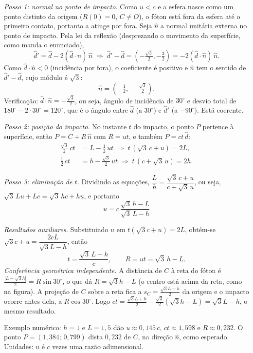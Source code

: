 \documentclass{article}%
\begin{document}
\emph{Passo 1: normal no ponto de impacto.} Como $u<c$ e a esfera nasce como um ponto distinto da origem ($R(0)=0$, $C\neq O$), o fóton está fora da esfera até o primeiro contato, portanto a atinge por fora. Seja $\hat n$ a normal unitária externa no ponto de impacto. Pela lei da reflexão (desprezando o movimento da superfície, como manda o enunciado),
\[
\hat d'=\hat d-2(\hat d\cdot\hat n)\,\hat n
\;\Rightarrow\;
\hat d'-\hat d=\left(-\tfrac{\sqrt3}{2},-\tfrac32\right)=-2(\hat d\cdot \hat n)\,\hat n .
\]
Como $\hat d\cdot\hat n<0$ (incidência por fora), o coeficiente é positivo e $\hat n$ tem o sentido de $\hat d'-\hat d$, cujo módulo é $\sqrt3$:
\[
\hat n=\left(-\tfrac12,\,-\tfrac{\sqrt3}{2}\right).
\]
Verificação: $\hat d\cdot\hat n=-\tfrac{\sqrt3}{2}$, ou seja, ângulo de incidência de $30^\circ$ e desvio total de $180^\circ-2\cdot30^\circ=120^\circ$, que é o ângulo entre $\hat d$ (a $30^\circ$) e $\hat d'$ (a $-90^\circ$). Está coerente.

\emph{Passo 2: posição do impacto.} No instante $t$ do impacto, o ponto $P$ pertence à superfície, então $P=C+R\,\hat n$ com $R=ut$, e também $P=ct\,\hat d$:
\begin{align*}
\tfrac{\sqrt3}{2}\,ct&=L-\tfrac12\,ut \;\Rightarrow\; t\,(\sqrt3\,c+u)=2L,\\
\tfrac12\,ct&=h-\tfrac{\sqrt3}{2}\,ut \;\Rightarrow\; t\,(c+\sqrt3\,u)=2h.
\end{align*}

\emph{Passo 3: eliminação de $t$.} Dividindo as equações, $\dfrac{L}{h}=\dfrac{\sqrt3\,c+u}{c+\sqrt3\,u}$, ou seja, $\sqrt3\,Lu+Lc=\sqrt3\,hc+hu$, e portanto
\[
\boxed{\,u=c\,\frac{\sqrt3\,h-L}{\sqrt3\,L-h}\,}
\]

\emph{Resultados auxiliares.} Substituindo $u$ em $t(\sqrt3c+u)=2L$, obtém-se $\sqrt3c+u=\dfrac{2cL}{\sqrt3L-h}$, então
\[
t=\frac{\sqrt3\,L-h}{c},\qquad R=ut=\sqrt3\,h-L .
\]
\emph{Conferência geométrica independente.} A distância de $C$ à reta do fóton é $\frac{|L-\sqrt3h|}{2}=R\sin30^\circ$, o que dá $R=\sqrt3h-L$ (o centro está acima da reta, como na figura). A projeção de $C$ sobre a reta fica a $s_C=\frac{\sqrt3L+h}{2}$ da origem e o impacto ocorre antes dela, a $R\cos30^\circ$. Logo $ct=\frac{\sqrt3L+h}{2}-\frac{\sqrt3}{2}(\sqrt3h-L)=\sqrt3L-h$, o mesmo resultado. 

Exemplo numérico: $h=1$ e $L=1{,}5$ dão $u\approx0{,}145\,c$, $ct\approx1{,}598$ e $R\approx0{,}232$. O ponto $P=(1{,}384;\,0{,}799)$ dista $0{,}232$ de $C$, na direção $\hat n$, como esperado. Unidades: $u$ é $c$ vezes uma razão adimensional.
\end{document}
